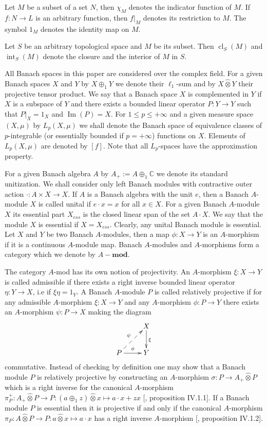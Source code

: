 \documentclass[12pt]{article}
\newcommand{\projtens}{\mathbin{\widehat{\otimes}}}
\begin{document}
Let $M$ be a subset of a set $N$, then $\chi_M$ denotes the indicator function of $M$. If $f:N\to L$ is an arbitrary function, then $f|_M$ denotes its restriction to $M$. The symbol $1_M$ denotes the identity map on $M$.

Let $S$ be an arbitrary topological space and $M$ be its subset. Then $\operatorname{cl}_S(M)$ and $\operatorname{int}_S(M)$ denote the closure and the interior of $M$ in $S$.

All Banach spaces in this paper are considered over the complex field. For a given Banach spaces $X$ and $Y$ by $X\oplus_1 Y$ we denote their $\ell_1$-sum and by $X\projtens Y$ their projective tensor product. We say that a Banach space $X$ is complemented in $Y$ if $X$ is a subspace of $Y$ and there exists a bounded linear operator $P:Y\to Y$ such that $P|_X=1_X$ and $\operatorname{Im}(P)=X$. For $1\leq p\leq +\infty$ and a given measure space $(X,\mu)$ by $L_p(X,\mu)$ we shall denote the Banach space of equivalence classes of $p$-integrable (or essentially bounded if $p=+\infty$) functions on $X$. Elements of $L_p(X,\mu)$ are denoted by $[f]$. Note that all $L_p$-spaces have the approximation property.

For a given Banach algebra $A$ by $A_+:=A\oplus_1 \mathbb{C}$ we denote its standard unitization. We shall consider only left Banach modules with contractive outer action $\cdot:A\times X\to X$. If $A$ is a Banach algebra with the unit $e$, then a Banach $A$-module $X$ is called unital if $e\cdot x=x$ for all $x\in X$. For a given Banach $A$-module $X$ its essential part $X_{ess}$ is the closed linear span of the set $A\cdot X$. We say that the module $X$ is essential if $X=X_{ess}$. Clearly, any unital Banach module is essential. Let $X$ and $Y$ be two Banach $A$-modules, then a map $\phi:X\to Y$ is an $A$-morphism if it is a continuous $A$-module map. Banach $A$-modules and $A$-morphisms form a category which we denote by $A-\mathbf{mod}$.

The category $A$-mod has its own notion of projectivity. An $A$-morphism $\xi:X\to Y$ is called admissible if there exists a right inverse bounded linear operator $\eta:Y\to X$, i.e if $\xi\eta=1_Y$. A Banach $A$-module $P$ is called relatively projective if for any admissible $A$-morphism $\xi:X\to Y$ and any $A$-morphism $\phi:P\to Y$ there exists an $A$-morphism $\psi:P\to X$ making the diagram
$$
    \xymatrix{
    & {X} \ar[d]^{\xi}\\
    {P} \ar@{-->}[ur]^{\psi} \ar[r]^{\phi} &{Y}}
$$
commutative. Instead of checking by definition one may show that a Banach module $P$ is relatively projective by constructing an $A$-morphism $\sigma:P\to A_+\projtens P$ which is a right inverse for the canonical $A$-morphism $\pi_P^+:A_+\projtens P\to P:(a\oplus_1 z)\projtens x\mapsto a\cdot x+z x$ [\cite{HelHomolBanTopAlg}, proposition IV.1.1]. If a Banach module $P$ is essential then it is projective if and only if the canonical $A$-morphism $\pi_P:A\projtens P\to P: a\projtens x\mapsto a\cdot x$ has a right inverse $A$-morphism [\cite{HelHomolBanTopAlg}, proposition IV.1.2].
\end{document}
